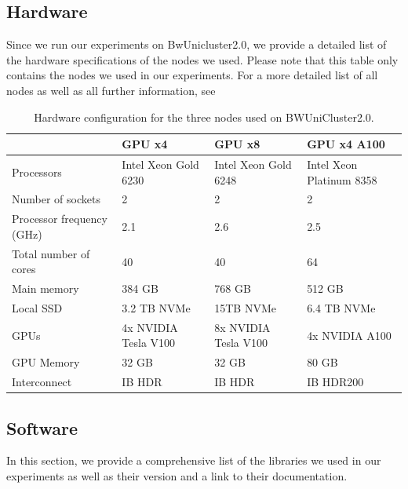 \subsection{Hardware}
\label{sec:Appendix:Hardware}
Since we run our experiments on BwUnicluster2.0, we provide a detailed list of the hardware specifications of the nodes we used. Please
note that this table only contains the nodes we used in our experiments. For a more detailed list of all nodes as well as all further
information, see \cite{bwUniclusterHardware}

\newpage

\begin{table}[!htb]
    \begin{tabularx}{\textwidth}{|X | X X X|} 
        \hline
         & GPU x4 & GPU x8 & GPU x4 A100 \\ 
        \hline 
        Processors & Intel Xeon Gold 6230 & Intel Xeon Gold 6248 & Intel Xeon Platinum 8358  \\ 
        Number of sockets & 2 & 2 & 2  \\ 
        Processor frequency (GHz) & 2.1 & 2.6 & 2.5  \\ 
        Total number of cores & 40 & 40 & 64  \\ 
        Main memory & 384 GB & 768 GB & 512 GB  \\ 
        Local SSD & 3.2 TB NVMe & 15TB NVMe & 6.4 TB NVMe  \\ 
        GPUs & 4x NVIDIA Tesla V100 & 8x NVIDIA Tesla V100 & 4x NVIDIA A100  \\ 
        GPU Memory & 32 GB  & 32 GB & 80 GB  \\ 
        Interconnect & IB HDR & IB HDR & IB HDR200  \\ 
        \hline
    \end{tabularx}
    \caption{Hardware configuration for the three nodes used on BWUniCluster2.0. }
    \label{fig:HardwareSpec}
\end{table}


\subsection{Software}
\label{sec:Appendix:Software}
In this section, we provide a comprehensive list of the libraries we used in our experiments as well as their version
and a link to their documentation.

